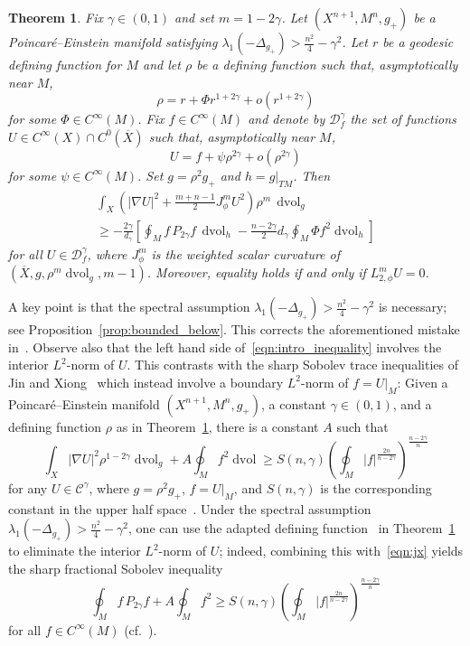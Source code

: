 \documentclass{amsart}
\newtheorem{thm}{Theorem}[section]
\theoremstyle{definition}
\theoremstyle{remark}
\numberwithin{equation}{section}
\begin{document}
\begin{thm}
 \label{thm:intro_inequality}
 Fix $\gamma\in(0,1)$ and set $m=1-2\gamma$.  Let $(X^{n+1},M^n,g_+)$ be a Poincar\'e--Einstein manifold satisfying $\lambda_1(-\Delta_{g_+})>\frac{n^2}{4}-\gamma^2$.  Let $r$ be a geodesic defining function for $M$ and let $\rho$ be a defining function such that, asymptotically near $M$,
 \[ \rho = r + \Phi r^{1+2\gamma} + o(r^{1+2\gamma}) \]
 for some $\Phi\in C^\infty(M)$.  Fix $f\in C^\infty(M)$ and denote by ${\mathcal{D}}_f^\gamma$ the set of functions $U\in C^\infty(X)\cap C^0({\overline{X}})$ such that, asymptotically near $M$,
 \[ U = f + \psi\rho^{2\gamma} + o(\rho^{2\gamma}) \]
 for some $\psi\in C^\infty(M)$.  Set $g=\rho^2g_+$ and $h=g{\rvert}_{TM}$.  Then
 \begin{multline}
  \label{eqn:intro_inequality}
  \int_X \left({\lvert}\nabla U{\rvert}^2 + \frac{m+n-1}{2}J_\phi^m U^2\right) \rho^m\,\operatorname{dvol}_g \\ \geq -\frac{2\gamma}{d_\gamma}\left[ \oint_M f\,P_{2\gamma}f\,\operatorname{dvol}_h - \frac{n-2\gamma}{2}d_\gamma\oint_M\Phi f^2\operatorname{dvol}_h \right]
 \end{multline}
 for all $U\in{\mathcal{D}}_f^\gamma$, where $J_\phi^m$ is the weighted scalar curvature of $({\overline{X}},g,\rho^m\operatorname{dvol}_g,m-1)$.  Moreover, equality holds if and only if $L_{2,\phi}^mU=0$.
\end{thm}

A key point is that the spectral assumption $\lambda_1\left(-\Delta_{g_+}\right)>\frac{n^2}{4}-\gamma^2$ is necessary; see Proposition~\ref{prop:bounded_below}.  This corrects the aforementioned mistake in~\cite{GonzalezQing2010}.  Observe also that the left hand side of~\eqref{eqn:intro_inequality} involves the interior $L^2$-norm of $U$.  This contrasts with the sharp Sobolev trace inequalities of Jin and Xiong~\cite{JinXiong2012} which instead involve a boundary $L^2$-norm of $f=U{\rvert}_M$: Given a Poincar\'e--Einstein manifold $(X^{n+1},M^n,g_+)$, a constant $\gamma\in(0,1)$, and a defining function $\rho$ as in Theorem~\ref{thm:intro_inequality}, there is a constant $A$ such that
\begin{equation}
 \label{eqn:jx}
 \int_X {\lvert}\nabla U{\rvert}^2\rho^{1-2\gamma}\operatorname{dvol}_g + A\oint_M f^2\operatorname{dvol} \geq S(n,\gamma)\left(\oint_M {\lvert} f{\rvert}^{\frac{2n}{n-2\gamma}}\right)^{\frac{n-2\gamma}{n}}
\end{equation}
for any $U\in {\mathcal{C}}^\gamma$, where $g=\rho^2g_+$, $f=U{\rvert}_M$, and $S(n,\gamma)$ is the corresponding constant in the upper half space~\cite{GonzalezQing2010,JinXiong2012}.  Under the spectral assumption $\lambda_1(-\Delta_{g_+})>\frac{n^2}{4}-\gamma^2$, one can use the adapted defining function~\cite[Subsection~6.1]{CaseChang2013} in Theorem~\ref{thm:intro_inequality} to eliminate the interior $L^2$-norm of $U$; indeed, combining this with~\eqref{eqn:jx} yields the sharp fractional Sobolev inequality
\[ \oint_M f\,P_{2\gamma}f + A\oint_M f^2 \geq S(n,\gamma)\left(\oint_M {\lvert} f{\rvert}^{\frac{2n}{n-2\gamma}}\right)^{\frac{n-2\gamma}{n}} \]
for all $f\in C^\infty(M)$ (cf.\ \cite{HebeyVaugon1996,JinXiong2012}).
\end{document}
